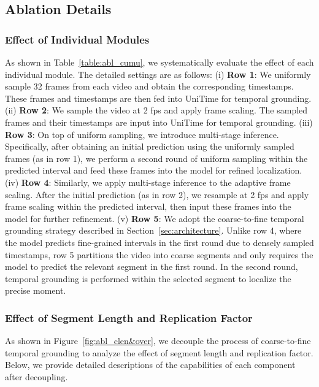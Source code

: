 \subsection{Ablation Details}
\label{sub:ablation}
\subsubsection{Effect of Individual Modules}
\label{subsub:individual}

As shown in Table~\ref{table:abl_cumu}, we systematically evaluate the effect of each individual module. The detailed settings are as follows:
(i) \textbf{Row 1}: We uniformly sample 32 frames from each video and obtain the corresponding timestamps. These frames and timestamps are then fed into UniTime for temporal grounding.
(ii) \textbf{Row 2}: We sample the video at 2 fps and apply frame scaling. The sampled frames and their timestamps are input into UniTime for temporal grounding.
(iii) \textbf{Row 3}: On top of uniform sampling, we introduce multi-stage inference. Specifically, after obtaining an initial prediction using the uniformly sampled frames (as in row 1), we perform a second round of uniform sampling within the predicted interval and feed these frames into the model for refined localization.
(iv) \textbf{Row 4}: Similarly, we apply multi-stage inference to the adaptive frame scaling. After the initial prediction (as in row 2), we resample at 2 fps and apply frame scaling within the predicted interval, then input these frames into the model for further refinement.
(v) \textbf{Row 5}: We adopt the coarse-to-fine temporal grounding strategy described in Section~\ref{sec:architecture}. Unlike row 4, where the model predicts fine-grained intervals in the first round due to densely sampled timestamps, row 5 partitions the video into coarse segments and only requires the model to predict the relevant segment in the first round. In the second round, temporal grounding is performed within the selected segment to localize the precise moment.

\subsubsection{Effect of Segment Length and Replication Factor}

As shown in Figure~\ref{fig:abl_clen&over}, we decouple the process of coarse-to-fine temporal grounding to analyze the effect of segment length and replication factor. Below, we provide detailed descriptions of the capabilities of each component after decoupling. 

